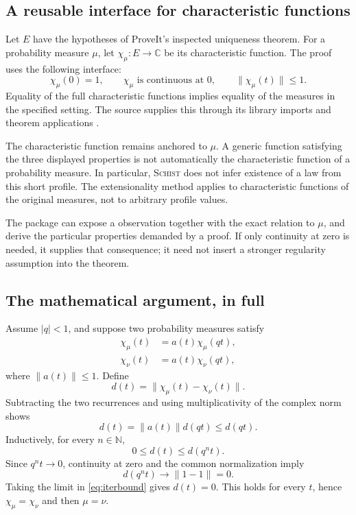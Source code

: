 \documentclass[11pt,a4paper]{article}
\newcommand{\code}[1]{\texttt{\detokenize{#1}}}
\newcommand{\Schist}{\textsc{Schist}}
\newcommand{\C}{\mathbb C}
\newcommand{\N}{\mathbb N}
\theoremstyle{definition}
\begin{document}
\subsection{A reusable interface for characteristic functions}
Let $E$ have the hypotheses of ProveIt's inspected uniqueness theorem. For a
probability measure $\mu$, let $\chi_\mu:E\to\C$ be its characteristic function.
The proof uses the following interface:
\[
 \chi_\mu(0)=1,\qquad \chi_\mu\text{ is continuous at }0,
 \qquad \|\chi_\mu(t)\|\le1.
\]
Equality of the full characteristic functions implies equality of the measures
in the specified setting. The source supplies this through its library
imports and theorem applications \cite{affine}.

The characteristic function remains anchored to $\mu$. A generic function
satisfying the three displayed properties is not automatically the
characteristic function of a probability measure. In particular, \Schist{}
does not infer existence of a law from this short profile. The extensionality
method applies to characteristic functions of the original measures, not to
arbitrary profile values.

The package can expose a \code{characteristic_profile(mu)} observation together
with the exact relation to $\mu$, and derive the particular properties demanded
by a proof. If only continuity at zero is needed, it supplies that consequence;
it need not insert a stronger regularity assumption into the theorem.

\subsection{The mathematical argument, in full}
Assume $|q|<1$, and suppose two probability measures satisfy
\begin{align}
 \chi_\mu(t)&=a(t)\chi_\mu(qt),\label{eq:recmu}\\
 \chi_\nu(t)&=a(t)\chi_\nu(qt),\label{eq:recnu}
\end{align}
where $\|a(t)\|\le1$. Define
\[
 d(t)=\|\chi_\mu(t)-\chi_\nu(t)\|.
\]
Subtracting the two recurrences and using multiplicativity of the complex norm
shows
\[
 d(t)=\|a(t)\|d(qt)\le d(qt).
\]
Inductively, for every $n\in\N$,
\begin{equation}\label{eq:iterbound}
 0\le d(t)\le d(q^nt).
\end{equation}
Since $q^nt\to0$, continuity at zero and the common normalization imply
\[
 d(q^nt)\longrightarrow\|1-1\|=0.
\]
Taking the limit in \eqref{eq:iterbound} gives $d(t)=0$. This holds for every
$t$, hence $\chi_\mu=\chi_\nu$ and then $\mu=\nu$.
\end{document}
